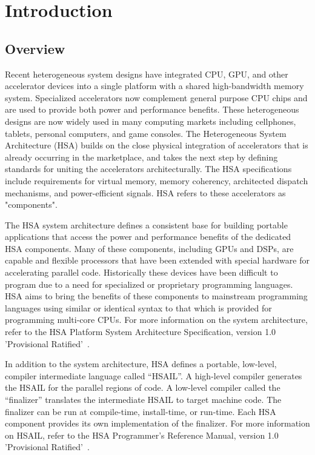 \documentclass[final,oneside]{book}
\begin{document}
\clearpage
{}
{} \tableofcontents

\clearpage
{}
\setcounter{page}{1}

\chapter{Introduction} \label{index}
\vspace{-7mm}
\section{Overview}\label{overview}
\vspace{-3mm}
Recent heterogeneous system designs have integrated CPU, GPU, and other
accelerator devices into a single platform with a shared high-bandwidth memory
system.  Specialized accelerators now complement general purpose CPU chips and
are used to provide both power and performance benefits.  These
heterogeneous designs are now widely used in many computing markets including
cellphones, tablets, personal computers, and game consoles. The Heterogeneous
System Architecture (HSA) builds on the close physical integration of
accelerators that is already occurring in the marketplace, and takes the next
step by defining standards for uniting the accelerators architecturally. The HSA
specifications include requirements for virtual memory, memory coherency,
architected dispatch mechanisms, and power-efficient signals. HSA refers to
these accelerators as "components".

The HSA system architecture defines a consistent base for building portable
applications that access the power and performance benefits of the dedicated HSA
components. Many of these components, including GPUs and DSPs, are capable and
flexible processors that have been extended with special hardware for
accelerating parallel code. Historically these devices have been difficult to
program due to a need for specialized or proprietary programming languages. HSA
aims to bring the benefits of these components to mainstream programming
languages using similar or identical syntax to that which is provided for
programming multi-core CPUs. For more information on the system architecture,
refer to the HSA Platform System Architecture Specification, version 1.0
'Provisional Ratified'~\cite{sar}.

In addition to the system architecture, HSA defines a portable, low-level,
compiler intermediate language called ``HSAIL''.  A high-level compiler
generates the HSAIL for the parallel regions of code. A low-level compiler
called the ``finalizer'' translates the intermediate HSAIL to target machine
code. The finalizer can be run at compile-time, install-time, or run-time. Each
HSA component provides its own implementation of the finalizer.  For more
information on HSAIL, refer to the HSA Programmer's Reference Manual, version
1.0 'Provisional Ratified'~\cite{prm}.
\end{document}

